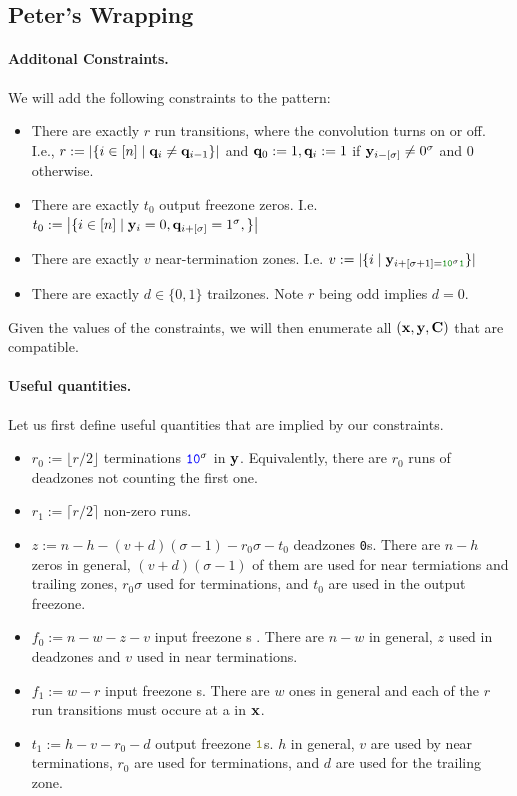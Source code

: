 \subsection{Peter's Wrapping}

\paragraph{Additonal Constraints.}
We will add the following constraints to the pattern:
\begin{itemize}
  \item There are exactly $r$ run transitions, where the convolution turns on or off. I.e., $r:=\left|\{i\in [n] \mid \mathbf{q}_{i}\neq \mathbf{q}_{i-1} \}\right|$ and $\mathbf{q}_0:=1,\mathbf{q}_i:=1$ if $\mathbf{y}_{i-[\sigma]}\neq0^\sigma$ and 0 otherwise.
  \item There are exactly $t_0$ output freezone zeros. I.e. $t_0:=\left|\{i \in [n] \mid \mathbf{y}_i=0,\mathbf{q}_{i+[\sigma]}=1^\sigma,\}\right|$
  \item There are exactly $v$ near-termination zones. I.e. $v:=|\{ i \mid \yv_{i+[\sigma+1] = \texttt{\green{10}}^{\sigma}\texttt{\green{1}}}\}|$
  \item There are exactly $d\in\{0,1\}$ trailzones. Note $r$ being odd implies $d=0$.
\end{itemize}

Given the values of the constraints, we will then enumerate all $(\mathbf{x},\mathbf{y},\mathbf{C})$ that are compatible.

\paragraph{Useful quantities.}
Let us first define useful quantities that are implied by our constraints.
\begin{itemize}
  \item $r_0:=\lfloor r/2\rfloor$ terminations $\texttt{\textcolor{blue}{10}}^\sigma$ in $\mathbf{y}$. Equivalently, there are $r_0$ runs of deadzones not counting the first one.
  \item $r_1:=\lceil r/2\rceil$ non-zero runs.
  \item $z:=n-h-(v+d)(\sigma -1)-r_0\sigma -t_0$  deadzones \texttt{0}s. There are $n-h$ zeros in general, $(v+d)(\sigma -1)$ of them are used for near termiations and trailing zones, $r_0\sigma$ used for terminations, and $t_0$ are used in the output freezone.
  \item $f_0:=n-w-z-v$ input freezone s . There are $n-w$ in general, $z$ used in deadzones and $v$ used in near terminations.
  \item $f_1:=w-r$ input freezone s. There are $w$ ones in general and each of the $r$ run transitions must occure at a  in $\mathbf{x}$.
  \item $t_1:=h-v-r_0-d$ output freezone $\olive{1}$s. $h$ in general, $v$ are used by near terminations, $r_0$ are used for terminations, and $d$ are used for the trailing zone.
\end{itemize}

